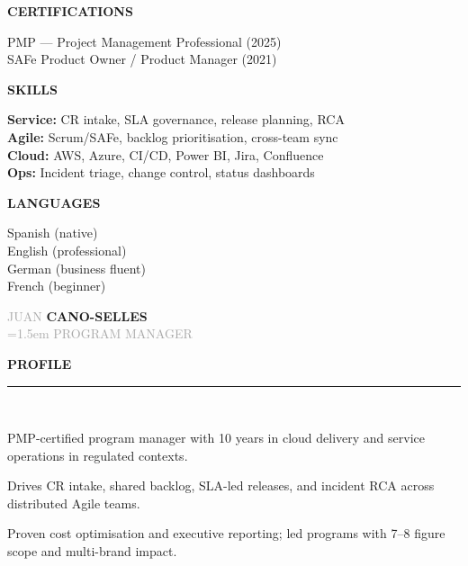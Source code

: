\documentclass[12pt,a4paper]{article}
\newcommand{\headleft}[1]{%
  \vspace*{2ex}\textsc{\textbf{\color{softwhite}#1}}\par%
  \vspace*{-1.2ex}{\color{softwhite}\hrulefill}\par\vspace*{0.8ex}
}
\newcommand{\headright}[1]{%
  \vspace{0.6ex}%
  {\sffont\bfseries\large\addfontfeatures{LetterSpace=2.0}\textcolor{cvblue}{\MakeUppercase{#1}}}\\[-1ex]%
  {\color{cvblue}\rule{\dimexpr\linewidth\relax}{0.6pt}}\\[-0.4ex]%
}
\newlength{\SideBarW}
\begin{document}
\begin{minipage}[t]{\textwidth}
{{\begin{minipage}[t]{\dimexpr\linewidth-8mm\relax}
      \vspace*{3mm}

      \headleft{CERTIFICATIONS}
      PMP — Project Management Professional (2025)\\[0.6ex]
      SAFe Product Owner / Product Manager (2021)

      \vspace*{3mm}

      \headleft{SKILLS}
      \textbf{Service:} CR intake, SLA governance, release planning, RCA\\[0.4ex]
      \textbf{Agile:} Scrum/SAFe, backlog prioritisation, cross-team sync\\[0.4ex]
      \textbf{Cloud:} AWS, Azure, CI/CD, Power BI, Jira, Confluence\\[0.4ex]
      \textbf{Ops:} Incident triage, change control, status dashboards

      \vspace*{3mm}

      \headleft{LANGUAGES}
      Spanish (native)\\[0.4ex]
      English (professional)\\[0.4ex]
      German (business fluent)\\[0.4ex]
      French (beginner)

    \end{minipage}
  }%
}%
\hspace{4mm}%
\begin{minipage}[t]{\dimexpr\textwidth-\SideBarW-4mm\relax}
  \raggedright
  \setlength{\parskip}{0.48ex}

\vspace*{14mm}
\begin{center}
  {\sffont\fontsize{40}{42}\textcolor{darkgray}{JUAN}}%
  \hspace{1.2em}%
  {\sffont\fontsize{40}{42}\bfseries{}\textcolor{cvblue}{CANO-SELLES}}\\[2ex]
  {\sffont\fontsize{16}{18}\textcolor{darkgray}{\spaceskip=1.5em PROGRAM MANAGER}}
\end{center}

\vspace{3mm}

\headright{Profile}
\vspace*{-0.4ex}
\begin{cvitemize}
  \item PMP-certified program manager with 10 years in cloud delivery and service operations in regulated contexts.
  \item Drives CR intake, shared backlog, SLA-led releases, and incident RCA across distributed Agile teams.
  \item Proven cost optimisation and executive reporting; led programs with 7–8 figure scope and multi-brand impact.
\end{cvitemize}


\end{minipage}
\end{minipage}
\end{document}
